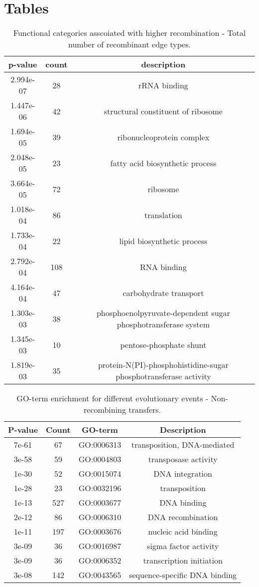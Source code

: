 \documentclass[english]{article}
\providecommand{\tabularnewline}{\\}
\begin{document}
\clearpage{}


\section*{Tables}

\clearpage{}

%
\begin{table}
\caption{\label{tab:functional}Functional categories asscoiated with higher
recombination - Total number of recombinant edge types.}
\begin{tabular}{ccc}
\hline 
p-value & count & description\tabularnewline
\hline 
2.994e-07 &  28 & rRNA binding\tabularnewline
1.447e-06 &  42 & structural constituent of ribosome\tabularnewline
1.694e-05 &  39 & ribonucleoprotein complex\tabularnewline
2.048e-05 &  23 & fatty acid biosynthetic process\tabularnewline
3.664e-05 &  72 & ribosome\tabularnewline
1.018e-04 &  86 & translation\tabularnewline
1.733e-04 &  22 & lipid biosynthetic process\tabularnewline
2.792e-04 & 108 & RNA binding\tabularnewline
4.164e-04 &  47 & carbohydrate transport\tabularnewline
1.303e-03 &  38 & phosphoenolpyruvate-dependent sugar phosphotransferase system\tabularnewline
1.345e-03 &  10 & pentose-phosphate shunt\tabularnewline
1.819e-03 &  35 & protein-N(PI)-phosphohistidine-sugar phosphotransferase activity\tabularnewline
\hline 
\end{tabular}
\end{table}
\clearpage{}


%
\begin{table}
\caption{\label{tab:go-events}GO-term enrichment for different
evolutionary events - Non-recombining transfers.}
\begin{tabular}{cccc}
\hline 
P-value & Count & GO-term & Description \\
\hline 
7e-61 &  67 & GO:0006313 & transposition, DNA-mediated\\
3e-58 &  59 & GO:0004803 & transposase activity\\
1e-30 &  52 & GO:0015074 & DNA integration\\
1e-28 &  23 & GO:0032196 & transposition\\
1e-13 & 527 & GO:0003677 & DNA binding\\
2e-12 &  86 & GO:0006310 & DNA recombination\\
1e-11 & 197 & GO:0003676 & nucleic acid binding\\
3e-09 &  36 & GO:0016987 & sigma factor activity\\
3e-09 &  36 & GO:0006352 & transcription initiation\\
3e-08 & 142 & GO:0043565 & sequence-specific DNA binding\\
\hline 
\end{tabular}
\end{table}
\clearpage{}
\end{document}
